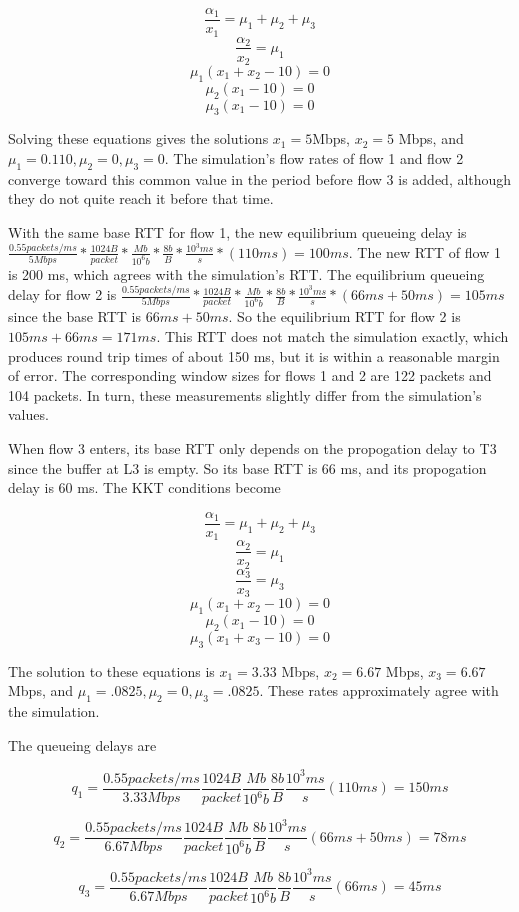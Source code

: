 \documentclass{article}
\begin{document}
$$\frac{\alpha_1}{x_1}=\mu_1+\mu_2+\mu_3$$
$$\frac{\alpha_2}{x_2}=\mu_1$$
$$\mu_1 (x_1 + x_2 - 10) = 0$$
$$\mu_2 (x_1 - 10) = 0$$
$$\mu_3 (x_1 - 10) = 0$$

Solving these equations gives the solutions $x_1 = 5$Mbps, $x_2 = 5$ Mbps, and $\mu_1 = 0.110, \mu_2 = 0, \mu_3 = 0$. The simulation's flow rates of flow 1 and flow 2 converge toward this common value in the period before flow 3 is added, although they do not quite reach it before that time.

With the same base RTT for flow 1, the new equilibrium queueing delay is  $\frac{0.55 packets/ms}{5 Mbps} * \frac{1024 B}{packet} * \frac{Mb}{10^6 b} * \frac{8 b}{B} * \frac{10^3 ms}{s} * (110 ms) = 100 ms$. The new RTT of flow 1 is 200 ms, which agrees with the simulation's RTT. The equilibrium queueing delay for flow 2 is $\frac{0.55 packets/ms}{5 Mbps} * \frac{1024 B}{packet} * \frac{Mb}{10^6 b} * \frac{8 b}{B} * \frac{10^3 ms}{s} * (66ms + 50ms) = 105 ms$ since the base RTT is $66 ms + 50 ms$. So the equilibrium RTT for flow 2 is $105ms + 66ms = 171 ms$. This RTT does not match the simulation exactly, which produces round trip times of about 150 ms, but it is within a reasonable margin of error.  The corresponding window sizes for flows 1 and 2 are 122 packets and 104 packets. In turn, these measurements slightly differ from the simulation's values.

When flow 3 enters, its base RTT only depends on the propogation delay to T3 since the buffer at L3 is empty. So its base RTT is 66 ms, and its propogation delay is 60 ms. The KKT conditions become

$$\frac{\alpha_1}{x_1}=\mu_1+\mu_2+\mu_3$$
$$\frac{\alpha_2}{x_2}=\mu_1$$
$$\frac{\alpha_3}{x_3}=\mu_3$$
$$\mu_1 (x_1 + x_2 - 10) = 0$$
$$\mu_2 (x_1 - 10) = 0$$
$$\mu_3 (x_1 + x_3 - 10) = 0$$

The solution to these equations is $x_1 = 3.33$ Mbps, $x_2 = 6.67$ Mbps, $x_3 = 6.67$ Mbps, and $\mu_1 = .0825, \mu_2 = 0, \mu_3 = .0825$. These rates approximately agree with the simulation.

The queueing delays are

$$q_1 = \frac{0.55 packets/ms}{3.33 Mbps} \frac{1024 B}{packet} \frac{Mb}{10^6 b} \frac{8 b}{B} \frac{10^3 ms}{s} (110 ms) = 150 ms$$

$$q_2 = \frac{0.55 packets/ms}{6.67 Mbps} \frac{1024 B}{packet} \frac{Mb}{10^6 b} \frac{8 b}{B} \frac{10^3 ms}{s} (66 ms + 50 ms) = 78 ms$$

$$q_3 = \frac{0.55 packets/ms}{6.67 Mbps} \frac{1024 B}{packet} \frac{Mb}{10^6 b} \frac{8 b}{B} \frac{10^3 ms}{s} (66 ms) = 45 ms$$
\end{document}
